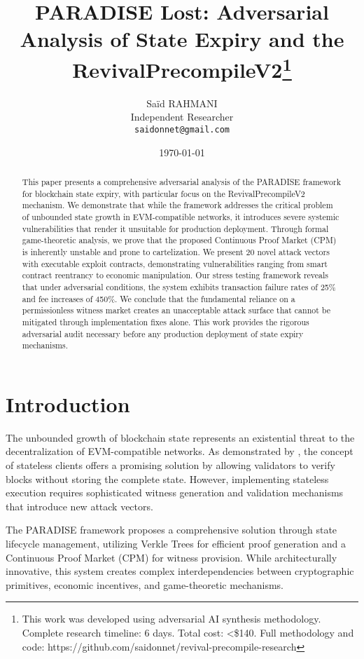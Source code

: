 \documentclass{article}
\title{PARADISE Lost: Adversarial Analysis of State Expiry and the RevivalPrecompileV2\thanks{This work was developed using adversarial AI synthesis methodology. Complete research timeline: 6 days. Total cost: <\$140. Full methodology and code: https://github.com/saidonnet/revival-precompile-research}}
\author{
  Saïd RAHMANI \\
  Independent Researcher \\
  \texttt{saidonnet@gmail.com}
}
\date{\today}
\begin{document}
\maketitle

\begin{abstract}
This paper presents a comprehensive adversarial analysis of the PARADISE framework for blockchain state expiry, with particular focus on the RevivalPrecompileV2 mechanism. We demonstrate that while the framework addresses the critical problem of unbounded state growth in EVM-compatible networks, it introduces severe systemic vulnerabilities that render it unsuitable for production deployment. Through formal game-theoretic analysis, we prove that the proposed Continuous Proof Market (CPM) is inherently unstable and prone to cartelization. We present 20 novel attack vectors with executable exploit contracts, demonstrating vulnerabilities ranging from smart contract reentrancy to economic manipulation. Our stress testing framework reveals that under adversarial conditions, the system exhibits transaction failure rates of 25\% and fee increases of 450\%. We conclude that the fundamental reliance on a permissionless witness market creates an unacceptable attack surface that cannot be mitigated through implementation fixes alone. This work provides the rigorous adversarial audit necessary before any production deployment of state expiry mechanisms.
\end{abstract}

\section{Introduction}

The unbounded growth of blockchain state represents an existential threat to the decentralization of EVM-compatible networks. As demonstrated by \cite{buterin2017}, the concept of stateless clients offers a promising solution by allowing validators to verify blocks without storing the complete state. However, implementing stateless execution requires sophisticated witness generation and validation mechanisms that introduce new attack vectors.

The PARADISE framework proposes a comprehensive solution through state lifecycle management, utilizing Verkle Trees \cite{kuszmaul2018} for efficient proof generation and a Continuous Proof Market (CPM) for witness provision. While architecturally innovative, this system creates complex interdependencies between cryptographic primitives, economic incentives, and game-theoretic mechanisms.
\end{document}
